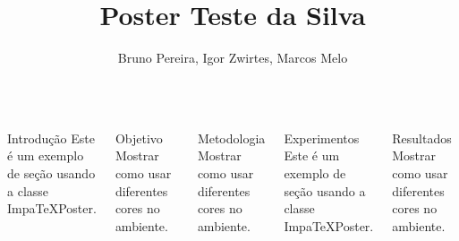 \documentclass[palette=basic,mode=light]{impaTeXPoster}
\title{Poster Teste da Silva}
\author{Bruno Pereira, Igor Zwirtes, Marcos Melo}
\begin{document}
\maketitle

\begin{columns}


\begin{postercard}{Introdução}
Este é um exemplo de seção usando a classe ImpaTeXPoster.

\lipsum[1]
\lipsum[1]
\end{postercard}


\begin{postercard}{Objetivo}
Mostrar como usar diferentes cores no ambiente.

\lipsum[2]
\end{postercard}

\begin{postercard}{Metodologia}
Mostrar como usar diferentes cores no ambiente.

\lipsum[2]
\end{postercard}


\begin{postercard}{Experimentos}
Este é um exemplo de seção usando a classe ImpaTeXPoster.

\lipsum[1]
\end{postercard}


\begin{postercard}{Resultados}
Mostrar como usar diferentes cores no ambiente.

\lipsum[2]
\lipsum[1]
\lipsum[3]
\end{postercard}



\end{columns}
\end{document}
